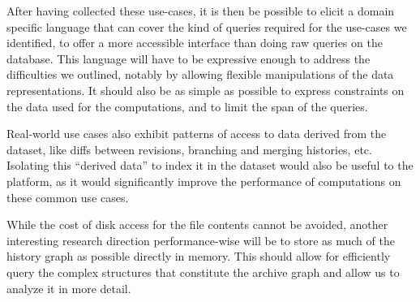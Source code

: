 After having collected these use-cases, it is then be possible to elicit a
domain specific language that can cover the kind of queries required
for the use-cases we identified, to offer a more accessible interface than
doing raw queries on the database. This language will have to be expressive
enough to address the difficulties we outlined, notably by allowing flexible
manipulations of the data representations. It should also be as simple as
possible to express constraints on the data used for the computations, and to
limit the span of the queries.

Real-world use cases also exhibit patterns of access to data derived from
the dataset, like diffs between revisions, branching and merging histories,
etc. Isolating this ``derived data'' to index it in the dataset would also be
useful to the platform, as it would significantly improve the performance of
computations on these common use cases.

While the cost of disk access for the file contents cannot be avoided, another
interesting research direction performance-wise will be to store as much of the
history graph as possible directly in memory. This should allow for efficiently
query the complex structures that constitute the archive graph and allow us to
analyze it in more detail.

